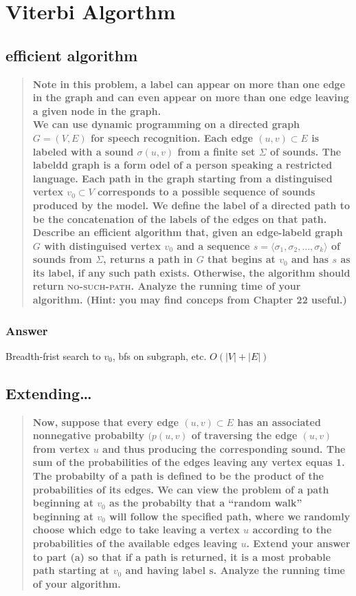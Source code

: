 \documentclass[titlepage]{article}\usepackage[]{graphicx}\usepackage[]{color}
\begin{document}
\section{Viterbi Algorthm}
	\subsection{efficient algorithm}
\begin{quote}
	\textbf{Note in this problem, a label can appear on more than one edge in the graph
		and can even appear on more than one edge leaving a given node in the graph.
		\\
		We can use dynamic programming on a directed graph $G = (V,E)$ for speech
		recognition. Each edge $(u,v) \subset E$ is labeled with a sound
		$\sigma(u,v)$ from a finite set $\Sigma$ of sounds. The labeldd graph is a
		form odel of a person speaking a restricted language. Each path in the graph
		starting from a distinguised vertex $v_0 \subset V$ corresponds to a possible
		sequence of sounds produced by the model. We define the label of a directed
		path to be the concatenation of the labels of the edges on that path. 
		Describe an efficient algorithm that, given an edge-labeld graph
		$G$ with distinguised vertex $v_0$ and a sequence $s = \langle \sigma_1,
		\sigma_2, \dots, \sigma_k \rangle$ of sounds from $\Sigma$, returns a path in
		$G$ that begins at $v_0$ and has $s$ as its label, if any such path exists.
		Otherwise, the algorithm should return \textsc{no-such-path}. Analyze the
		running time of your algorithm. (Hint: you may find conceps from Chapter 22
	useful.)}
\end{quote}

\subsubsection{Answer}
Breadth-frist search to $v_0$, bfs on subgraph, etc.
$O(|V|+|E|)$



\subsection{Extending\dots}

\begin{quote}
	\textbf{Now, suppose that every edge $(u,v) \subset E$ has an associated
		nonnegative probabilty $(p(u,v)$ of traversing the edge $(u,v)$ from
		vertex $u$ and thus producing the corresponding sound. The sum of the
		probabilities of the edges leaving any vertex equas 1. The probabilty of
		a path is defined to be the product of the probabilities of its edges. We
		can view the problem of a path beginning at $v_0$ as the probabilty that a
		``random walk'' beginning at $v_0$  will follow the specified path, where
		we randomly choose which edge to take leaving a vertex  $u$ according to
		the probabilities of the available edges leaving $u$. 
		Extend your answer to part (a) so that if a path is returned,
		it is a most probable path starting at $v_0$ and having label s. Analyze
	the running time of your algorithm. }
\end{quote}
\end{document}
